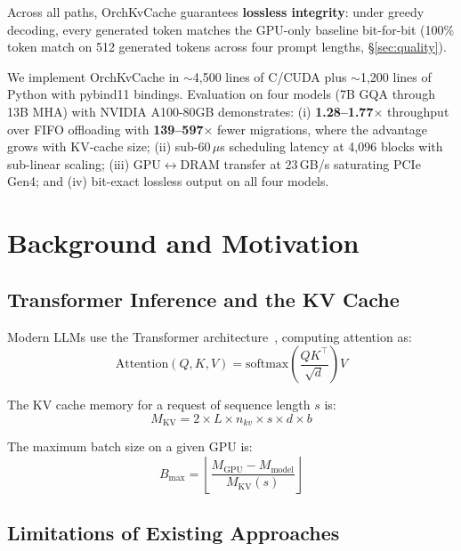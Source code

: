 \documentclass[conference]{IEEEtran}
\begin{document}
Across all paths, OrchKvCache guarantees \textbf{lossless integrity}: under greedy decoding, every generated token matches the GPU-only baseline bit-for-bit (100\% token match on 512 generated tokens across four prompt lengths, \S\ref{sec:quality}).

We implement OrchKvCache in ${\sim}$4,500 lines of C/CUDA plus ${\sim}$1,200 lines of Python with pybind11 bindings. Evaluation on four models (7B GQA through 13B MHA) with NVIDIA A100-80GB demonstrates: (i) \textbf{1.28--1.77$\times$} throughput over FIFO offloading with \textbf{139--597$\times$} fewer migrations, where the advantage grows with KV-cache size; (ii) sub-60\,$\mu$s scheduling latency at 4,096 blocks with sub-linear scaling; (iii) GPU$\leftrightarrow$DRAM transfer at 23\,GB/s saturating PCIe Gen4; and (iv) bit-exact lossless output on all four models.

\section{Background and Motivation}

\subsection{Transformer Inference and the KV Cache}

Modern LLMs use the Transformer architecture~\cite{transformer}, computing attention as:
\begin{equation}
\text{Attention}(Q, K, V) = \text{softmax}\!\left(\frac{QK^\top}{\sqrt{d}}\right) V
\end{equation}

The KV cache memory for a request of sequence length $s$ is:
\begin{equation}
M_{\text{KV}} = 2 \times L \times n_{kv} \times s \times d \times b
\end{equation}


The maximum batch size on a given GPU is:
\begin{equation}
B_{\max} = \left\lfloor \frac{M_{\text{GPU}} - M_{\text{model}}}{M_{\text{KV}}(s)} \right\rfloor
\end{equation}

\subsection{Limitations of Existing Approaches}
\end{document}
